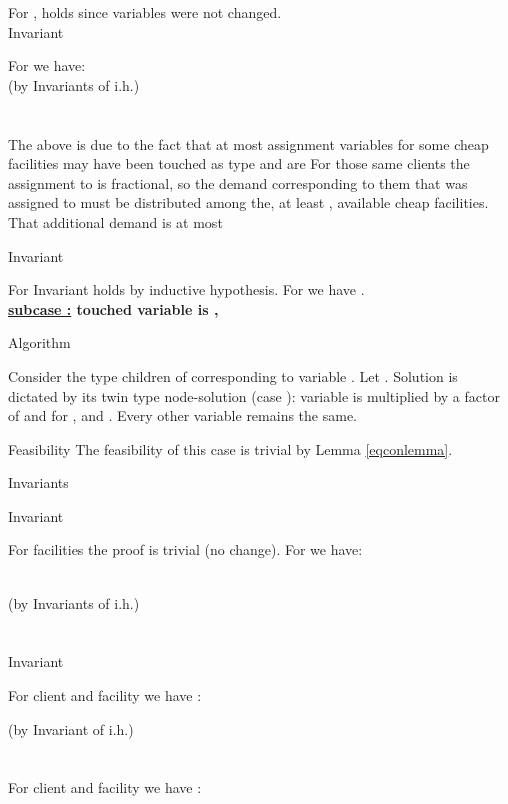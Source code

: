 \documentclass[11pt]{article}\usepackage{amsmath}
\begin{document}
For ,  holds since variables  were
not changed. \\


{\sf Invariant }

For  we have:\\

\noindent
 \hfill (by Invariants   of i.h.)\\
\\
\\

The  above is due to the fact that at most  assignment variables
 for some cheap facilities may have been touched as type  and are  
For  those same clients the assignment to  is fractional,
 so the demand
corresponding to them  that was assigned to    must be 
distributed among the, at least , available
cheap facilities. That additional demand is 
at most 

{\sf Invariant }

For  Invariant  holds by inductive hypothesis. For  we have .\\





\medskip
\noindent
{\bf \underline{subcase :} touched variable is  , }

{\sc Algorithm}

Consider the type  children  of  corresponding to variable . 
Let . Solution  is dictated by its twin type  node-solution (case ):
variable  is multiplied by a factor of  and  for ,  and
  . Every other variable remains the same.


{\sc Feasibility}
The feasibility of this case is trivial by Lemma \ref{eqconlemma}.

{\sc Invariants}

{\sf Invariant }

For facilities  the proof is trivial (no change).
For  we have:

\noindent
\\
 \hfill (by Invariants   of i.h.) \\
\\
\\

{\sf Invariant }

For client  and facility  we have :

\noindent
 \hfill (by Invariant  of i.h.)\\
\\
\\

For client  and facility  we have :
\end{document}
